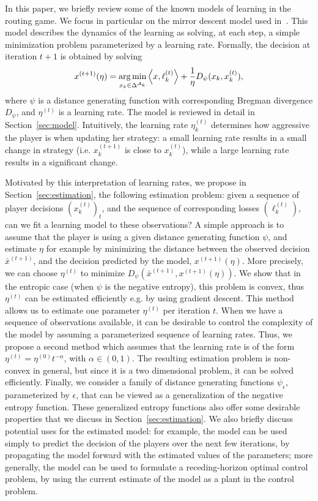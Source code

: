 \documentclass{sig-alternate-ipsn13}
\begin{document}
In this paper, we briefly review some of the known models of learning in the routing game. We focus in particular on the mirror descent model used in~\cite{krichene2015SMD}. This model describes the dynamics of the learning as solving, at each step, a simple minimization problem parameterized by a learning rate. Formally, the decision at iteration $t+1$ is obtained by solving
\[
x^{(t+1)}(\eta) = \operatorname*{arg\,min}_{x_k \in \Delta^{\mathcal{A}_k}} \left\langle x, \ell^{(t)}_k \right\rangle + \frac{1}{\eta} D_\psi(x_k, x^{(t)}_k),
\]
where $\psi$ is a distance generating function with corresponding Bregman divergence $D_\psi$, and $\eta^{(t)}$ is a learning rate. The model is reviewed in detail in Section~\ref{sec:model}. Intuitively, the learning rate $\eta_k^{(t)}$ determines how aggressive the player is when updating her strategy: a small learning rate results in a small change in strategy (i.e. $x^{(t+1)}_k$ is close to $x_k^{(t)}$), while a large learning rate results in a significant change.

Motivated by this interpretation of learning rates, we propose in Section~\ref{sec:estimation}, the following estimation problem: given a sequence of player decisions $(x^{(t)}_k)_t$, and the sequence of corresponding losses $(\ell_k^{(t)})$, can we fit a learning model to these observations? A simple approach is to assume that the player is using a given distance generating function $\psi$, and estimate $\eta$ for example by minimizing the distance between the observed decision $\bar x^{(t+1)}$, and the decision predicted by the model, $x^{(t+1)}(\eta)$. More precisely, we can choose $\eta^{(t)}$ to minimize $D_\psi(\bar x^{(t+1)}, x^{(t+1)}(\eta))$. We show that in the entropic case (when $\psi$ is the negative entropy), this problem is convex, thus $\eta^{(t)}$ can be estimated efficiently e.g. by using gradient descent. This method allows us to estimate one parameter $\eta^{(t)}$ per iteration $t$. When we have a sequence of observations available, it can be desirable to control the complexity of the model by assuming a parameterized sequence of learning rates. Thus, we propose a second method which assumes that the learning rate is of the form $\eta^{(t)} = \eta^{(0)} t^{-\alpha}$, with $\alpha \in (0, 1)$. The resulting estimation problem is non-convex in general, but since it is a two dimensional problem, it can be solved efficiently. Finally, we consider a family of distance generating functions $\psi_\epsilon$, parameterized by $\epsilon$, that can be viewed as a generalization of the negative entropy function. These generalized entropy functions also offer some desirable properties that we discuss in Section~\ref{sec:estimation}. We also briefly discuss potential uses for the estimated model: for example, the model can be used simply to predict the decision of the players over the next few iterations, by propagating the model forward with the estimated values of the parameters; more generally, the model can be used to formulate a receding-horizon optimal control problem, by using the current estimate of the model as a plant in the control problem.
\end{document}
